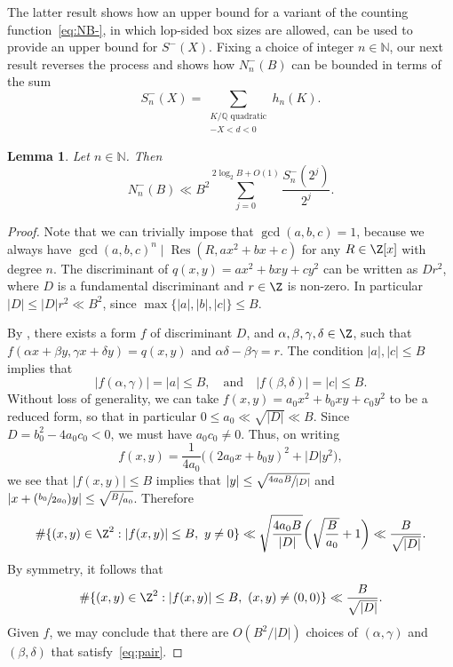 \documentclass[JEP,XML,SOM,Unicode]{cedram}
\newcommand{\Psfrac}[2]{(\sfrac{#1}{#2})}
\DeclareMathOperator{\Res}{Res}
\newcommand{\NN}{\mathbb{N}}
\newcommand{\QQ}{\mathbb{Q}}\let\Q\QQ
\newtheorem{lemma}[theorem]{Lemma}
\begin{document}
The latter result shows how an upper bound for a variant of the counting function~\eqref{eq:NB-},
in which lop-sided box sizes are allowed, can be used to provide an upper bound for $S^-(X)$.
Fixing a choice of integer $n\in \NN$,
our next result reverses the process and shows how
$N_n^-(B)$ can be bounded in terms of the sum
\[
S_n^-(X)=
\sum_{
\substack{K/\QQ \text{ quadratic}\\
-X<d<0
}} h_n(K).
\]

\begin{lemma}
Let $n\in \NN$. Then
\[
N_n^-(B)\ll
B^2 \sum_{j=0}^{2\log_2 B+O(1)}
\frac{S_n^-(2^j)}{2^j}.
\]
\end{lemma}

\begin{proof}
Note that we can trivially impose that $\gcd(a,b,c)=1$, because we always have $\gcd(a,b,c)^n\mid \Res(R,ax^2+bx+c)$ for any $R\in\Z[x]$ with degree $n$.
The discriminant of $q(x,y)=ax^2+bxy+cy^2$ can be written as $Dr^2$, where $D$ is a fundamental discriminant and $r\in\Z$ is non-zero.
In particular $|D|\leq |D|r^2\ll B^2$, since $\max\{|a|,|b|,|c|\}\leq B$.

By \cite[Prop.\,7.1]{Buell}, there exists a form $f$ of discriminant $D$, and $\alpha,\beta,\gamma,\delta \in\Z$, such that $f(\alpha x+\beta y,\gamma x+\delta y)=q(x,y)$ and $\alpha\delta-\beta\gamma=r$.
The condition $|a|,|c|\leq B$ implies that
\begin{equation}\label{eq:pair}
|f(\alpha ,\gamma )|=|a|\leq B, \quad\text{and}\quad |f(\beta ,\delta )|=|c|\leq B.
\end{equation}
Without loss of generality, we can take $f(x,y)=a_0x^2+b_0xy+c_0y^2$ to be a reduced form, so that in particular $0\leq a_0\ll \sqrt{|D|}\ll B$. Since $D=b_0^2-4a_0c_0<0$, we must have $a_0c_0\neq0$. Thus, on writing
\[
f(x,y)=\frac{1}{4a_0}\bigl((2a_0x+b_0y)^2+|D|y^2\bigr),
\]
we see that $|f(x ,y)|\leq B$ implies that $|y|\leq\sqrt{ \sfrac{4a_0B}{|D|}}$ and $|x+\Psfrac{b_0}{2a_0}y|\leq \sqrt{\sfrac{B}{a_0}}$. Therefore
\[
\#\{(x,y)\in\Z^2: |f(x,y)|\leq B,\ y\neq 0\}\ll \sqrt{ \frac{4a_0B}{|D|}}\biggl( \sqrt{\frac{B}{a_0}}+1\biggr)\ll \frac{B}{\sqrt{|D|}}.
\]
By symmetry, it follows that
\[
\#\{(x,y)\in\Z^2: |f(x,y)|\leq B,\ (x,y)\neq (0,0)\}\ll \frac{B}{\sqrt{|D|}}.
\]
Given $f$, we may conclude that there are $O(B^2/|D|)$
choices of $(\alpha ,\gamma )$ and $(\beta ,\delta )$ that satisfy~\eqref{eq:pair}.


\end{proof}
\end{document}
